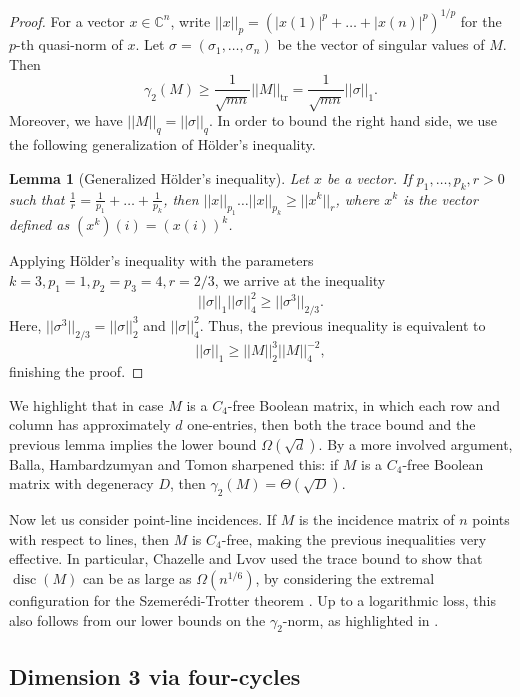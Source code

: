 \documentclass[11pt]{article}
\theoremstyle{plain}
\newtheorem{lemma}[theorem]{Lemma}
\theoremstyle{definition}
\DeclareMathOperator{\tr}{tr}
\DeclareMathOperator{\disc}{disc}
\begin{document}
	\begin{proof}
		For a vector $x\in \mathbb{C}^n$, write $||x||_p=(|x(1)|^p+\dots+|x(n)|^p)^{1/p}$ for the $p$-th quasi-norm of $x$. Let $\sigma=(\sigma_1,\dots,\sigma_n)$ be the vector of singular values of $M$. Then
		$$\gamma_2(M)\geq \frac{1}{\sqrt{mn}}||M||_{\tr}=\frac{1}{\sqrt{mn}}||\sigma||_1.$$
		Moreover, we have $||M||_q=||\sigma||_q$. In order to bound the right hand side, we use the following generalization of H\"older's inequality.
		
		\begin{lemma}[Generalized H\"older's inequality]
			Let $x$ be a vector. If $p_1,\dots,p_k,r>0$ such that $\frac{1}{r}=\frac{1}{p_1}+\dots+\frac{1}{p_k}$, then $||x||_{p_1}\dots ||x||_{p_k}\geq ||x^{k}||_r $, where $x^{k}$ is the vector defined as $(x^k)(i)=(x(i))^k$.
		\end{lemma}
		
		Applying H\"older's inequality  with the parameters $k=3,p_1=1,p_2=p_3=4,r=2/3$,  we arrive at the inequality
		\begin{equation*}
			||\sigma||_1 ||\sigma||_4^2 \geq ||\sigma^3||_{2/3}.
		\end{equation*}
		Here, $||\sigma^3||_{2/3}=||\sigma||_2^3$ and $||\sigma||_4^2$. Thus, the previous inequality is equivalent to
		$$||\sigma||_1\geq ||M||_2^{3}||M||_4^{-2},$$
		finishing the proof.
	\end{proof}
	
	We highlight that in case $M$ is a $C_4$-free Boolean matrix, in which each row and column has approximately $d$ one-entries, then both the trace bound and the previous lemma implies the lower bound $\Omega(\sqrt{d})$. By a more involved argument, Balla, Hambardzumyan and Tomon \cite{BHT} sharpened this:  if $M$ is a $C_4$-free Boolean matrix with degeneracy $D$, then $\gamma_2(M)=\Theta(\sqrt{D})$.
	
	Now let us consider point-line incidences. If $M$ is the incidence matrix of $n$ points with respect to lines, then $M$ is $C_4$-free, making the previous inequalities very effective. In particular, Chazelle and Lvov \cite{ChL} used the trace bound to show that $\disc(M)$ can be as large as $\Omega(n^{1/6})$, by considering the extremal configuration for the Szemer\'edi-Trotter theorem \cite{SzT}. Up to a logarithmic loss, this also follows from our lower bounds on the $\gamma_2$-norm, as highlighted in \cite{BHT}. 
	
	\subsection{Dimension 3 via four-cycles}\label{sect:dim3}
	
\end{document}
